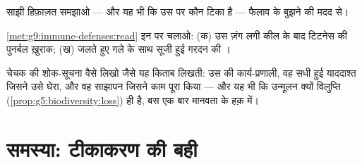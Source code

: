 \begin{exercise}[$\star\star$]\label{exo:g9:immune-defenses:10}
साझी हिफ़ाज़त समझाओ --- और यह भी कि उस पर कौन टिका है --- फैलाव के बुझने
की मदद से।
\end{exercise}

\begin{exercise}[$\star\star$]\label{exo:g9:immune-defenses:11}
\cref{met:g9:immune-defenses:read} इन पर चलाओ: (क) उस ज़ंग लगी कील के
बाद टिटनेस की पुनर्बल ख़ुराक; (ख) जलते हुए गले के साथ सूजी हुई गरदन की
।
\end{exercise}

\begin{exercise}[$\star\star\star$]\label{exo:g9:immune-defenses:12}
चेचक की शोक-सूचना वैसे लिखो जैसे यह किताब लिखती: उस  की
कार्य-प्रणाली, वह सधी हुई याददाश्त जिसने उसे घेरा, और वह साझापन जिसने काम
पूरा किया --- और यह भी कि उन्मूलन क्यों विलुप्ति
(\cref{prop:g5:biodiversity:loss}) ही है, बस एक बार मानवता के हक़ में।
\end{exercise}

\section{समस्या: टीकाकरण की बही}

